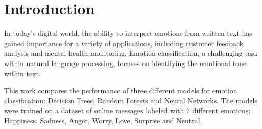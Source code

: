 \section{Introduction}
\label{sec:introduction}
In today's digital world, the ability 
to interpret emotions from written text 
has gained importance for a variety of 
applications, including customer feedback 
analysis and mental health monitoring. 
Emotion classification, a challenging 
task within natural language processing, 
focuses on identifying the emotional 
tone within text.

This work compares the performance of
three different models for emotion
classification: Decision Trees, Random
Forests and Neural Networks. The models
were trained on a dataset of online 
messages labeled with 7 different
emotions: Happiness, Sadness, Anger,
Worry, Love, Surprise and Neutral.